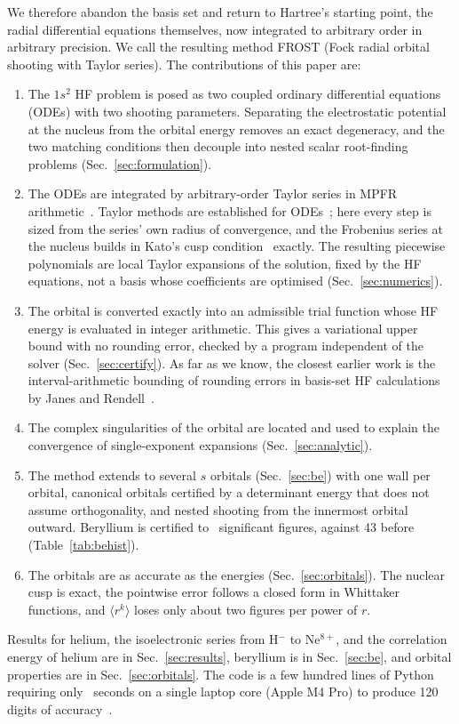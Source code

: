 \documentclass[aps,pra,reprint,superscriptaddress,amsmath,amssymb,longbibliography]{revtex4-2}
\begin{document}
We therefore abandon the basis set and return to Hartree's starting point, the radial differential equations themselves, now integrated to arbitrary order in arbitrary precision. We call the resulting method FROST (Fock radial orbital shooting with Taylor series). The contributions of this paper are:
\begin{enumerate}
\item The $1s^2$ HF problem is posed as two coupled ordinary differential equations (ODEs) with two shooting parameters. Separating the electrostatic potential at the nucleus from the orbital energy removes an exact degeneracy, and the two matching conditions then decouple into nested scalar root-finding problems (Sec.~\ref{sec:formulation}).
\item The ODEs are integrated by arbitrary-order Taylor series in MPFR arithmetic~\cite{MPFR}. Taylor methods are established for ODEs~\cite{Corliss1982,Jorba2005,Moore1966}; here every step is sized from the series' own radius of convergence, and the Frobenius series at the nucleus builds in Kato's cusp condition~\cite{Kato1957} exactly. The resulting piecewise polynomials are local Taylor expansions of the solution, fixed by the HF equations, not a basis whose coefficients are optimised (Sec.~\ref{sec:numerics}).
\item The orbital is converted exactly into an admissible trial function whose HF energy is evaluated in integer arithmetic. This gives a variational upper bound with no rounding error, checked by a program independent of the solver (Sec.~\ref{sec:certify}). As far as we know, the closest earlier work is the interval-arithmetic bounding of rounding errors in basis-set HF calculations by Janes and Rendell~\cite{Janes2011}.
\item The complex singularities of the orbital are located and used to explain the convergence of single-exponent expansions (Sec.~\ref{sec:analytic}).
\item The method extends to several $s$ orbitals (Sec.~\ref{sec:be}) with one wall per orbital, canonical orbitals certified by a determinant energy that does not assume orthogonality, and nested shooting from the innermost orbital outward. Beryllium is certified to \BeNsf\ significant figures, against 43 before (Table~\ref{tab:behist}).
\item The orbitals are as accurate as the energies (Sec.~\ref{sec:orbitals}). The nuclear cusp is exact, the pointwise error follows a closed form in Whittaker functions, and $\langle r^k\rangle$ loses only about two figures per power of $r$.
\end{enumerate}
Results for helium, the isoelectronic series from H$^-$ to Ne$^{8+}$, and the correlation energy of helium are in Sec.~\ref{sec:results}, beryllium is in Sec.~\ref{sec:be}, and orbital properties are in Sec.~\ref{sec:orbitals}. The code is a few hundred lines of Python requiring only \secRunA~seconds on a single laptop core (Apple M4 Pro) to produce 120 digits of accuracy~\cite{code}.
\end{document}

